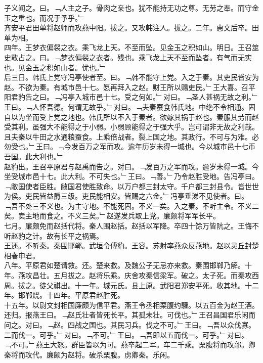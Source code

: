 \documentclass{zhvt-classic}
\begin{document}
\hspace*{2em}子义闻之。曰。﹁人主之子。骨肉之亲也。犹不能持无功之尊。无劳之奉。而守金玉之重也。而况于予乎。﹂\\
\hspace*{2em}齐安平君田单将赵师而攻燕中阳。拔之。又攻韩注人。拔之。二年。惠文后卒。田单为相。\\
\hspace*{2em}四年。王梦衣偏裻之衣。乘飞龙上天。不至而坠。见金玉之积如山。明日。王召筮史敢占之。曰。﹁梦衣偏裻之衣者。残也。乘飞龙上天不至而坠者。有气而无实也。见金玉之积如山者。忧也。﹂\\
\hspace*{2em}后三日。韩氏上党守冯亭使者至。曰。﹁韩不能守上党。入之于秦。其吏民皆安为赵。不欲为秦。有城市邑十七。愿再拜入之赵。财王所以赐吏民。﹂王大喜。召平阳君豹告之曰。﹁冯亭入城市邑十七。受之何如。﹂对曰。﹁圣人甚祸无故之利。﹂王曰。﹁人怀吾德。何谓无故乎。﹂对曰。﹁夫秦蚕食韩氏地。中绝不令相通。固自以为坐而受上党之地也。韩氏所以不入于秦者。欲嫁其祸于赵也。秦服其劳而赵受其利。虽强大不能得之于小弱。小弱顾能得之于强大乎。岂可谓非无故之利哉。且夫秦以牛田之水通粮蚕食。上乘倍战者。裂上国之地。其政行。不可与为难。必勿受也。﹂王曰。﹁今发百万之军而攻。逾年历岁未得一城也。今以城市邑十七币吾国。此大利也。﹂\\
\hspace*{2em}赵豹出。王召平原君与赵禹而告之。对曰。﹁发百万之军而攻。逾岁未得一城。今坐受城市邑十七。此大利。不可失也。﹂王曰。﹁善。﹂乃令赵胜受地。告冯亭曰。﹁敝国使者臣胜。敝国君使胜致命。以万户都三封太守。千户都三封县令。皆世世为侯。吏民皆益爵三级。吏民能相安。皆赐之六金。﹂冯亭垂涕不见使者。曰。﹁吾不处三不义也。为主守地。不能死固。不义一矣。入之秦。不听主令。不义二矣。卖主地而食之。不义三矣。﹂赵遂发兵取上党。廉颇将军军长平。\\
\hspace*{2em}七月。廉颇免而赵括代将。秦人围赵括。赵括以军降。卒四十馀万皆阬之。王悔不听赵豹之计。故有长平之祸焉。\\
\hspace*{2em}王还。不听秦。秦围邯郸。武垣令傅豹。王容。苏射率燕众反燕地。赵以灵丘封楚相春申君。\\
\hspace*{2em}八年。平原君如楚请救。还。楚来救。及魏公子无忌亦来救。秦围邯郸乃解。十年。燕攻昌壮。五月拔之。赵将乐乘。庆舍攻秦信梁军。破之。太子死。而秦攻西周。拔之。徒父祺出。十一年。城元氏。县上原。武阳君郑安平死。收其地。十二年。邯郸烧。十四年。平原君赵胜死。\\
\hspace*{2em}十五年。以尉文封相国廉颇为信平君。燕王令丞相栗腹约驩。以五百金为赵王酒。还归。报燕王曰。﹁赵氏壮者皆死长平。其孤未壮。可伐也。﹂王召昌国君乐闲而问之。对曰。﹁赵。四战之国也。其民习兵。伐之不可。﹂王曰。﹁吾以众伐寡。二而伐一。可乎。﹂对曰。﹁不可。﹂王曰。﹁吾即以五而伐一。可乎。﹂对曰。﹁不可。﹂燕王大怒。群臣皆以为可。燕卒起二军。车二千乘。栗腹将而攻鄗。卿秦将而攻代。廉颇为赵将。破杀栗腹。虏卿秦。乐闲。\\
\end{document}
